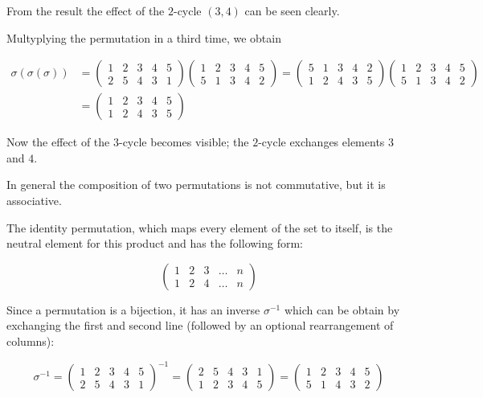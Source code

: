 From the result the effect of the \(2\)-cycle \((3,4)\) can be seen
clearly.

Multyplying the permutation in a third time, we obtain

\begin{align*}
\sigma(\sigma(\sigma)) &= 
\begin{pmatrix}
1 & 2 & 3 & 4 & 5 \\
2 & 5 & 4 & 3 & 1
\end{pmatrix}
\begin{pmatrix}
1 & 2 & 3 & 4 & 5 \\
5 & 1 & 3 & 4 & 2
\end{pmatrix}
=
\begin{pmatrix}
5 & 1 & 3 & 4 & 2 \\
1 & 2 & 4 & 3 & 5
\end{pmatrix}
\begin{pmatrix}
1 & 2 & 3 & 4 & 5 \\
5 & 1 & 3 & 4 & 2
\end{pmatrix}
 \\ & =
\begin{pmatrix}
1 & 2 & 3 & 4 & 5 \\
1 & 2 & 4 & 3 & 5
\end{pmatrix}
\end{align*}

Now the effect of the \(3\)-cycle becomes visible; the \(2\)-cycle
exchanges elements \(3\) and \(4\).

In general the composition of two permutations is not commutative, but
it is associative.

The identity permutation, which maps every element of the set to itself,
is the neutral element for this product and has the following form:

\[
\begin{pmatrix}
1 & 2 & 3 & \ldots & n \\
1 & 2 & 4 & \ldots & n
\end{pmatrix}
\]

Since a permutation is a bijection, it has an inverse \(\sigma^{-1}\)
which can be obtain by exchanging the first and second line (followed by an optional rearrangement of columns):

\[
\sigma^{-1} = 
\begin{pmatrix}
1 & 2 & 3 & 4 & 5 \\
2 & 5 & 4 & 3 & 1
\end{pmatrix}^{-1} = 
\begin{pmatrix}
2 & 5 & 4 & 3 & 1 \\
1 & 2 & 3 & 4 & 5
\end{pmatrix}
=
\begin{pmatrix}
1 & 2 & 3 & 4 & 5\\
5 & 1 & 4 & 3 & 2
\end{pmatrix}
\]

